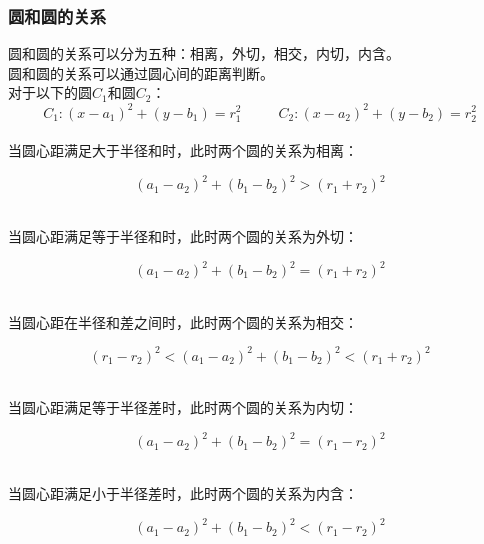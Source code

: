 \documentclass[UTF8]{ctexart}
\begin{document}
\subsubsection{圆和圆的关系}
    \setcounter{equation}{0}
    圆和圆的关系可以分为五种：相离，外切，相交，内切，内含。\\[3mm]
    圆和圆的关系可以通过圆心间的距离判断。\\[5mm]
    对于以下的圆$C_1$和圆$C_2$：
    \begin{equation}
        C_1:(x-a_1)^2+(y-b_1)=r_1^2~~~~~~~~~~~~C_2:(x-a_2)^2+(y-b_2)=r_2^2
    \end{equation}\\
    当圆心距满足大于半径和时，此时两个圆的关系为相离：
    \begin{large}
        \begin{equation*}
            \left(a_1-a_2\right)^2+\left(b_1-b_2\right)^2>(r_1+r_2)^2
        \end{equation*}
    \end{large}\\
    当圆心距满足等于半径和时，此时两个圆的关系为外切：
    \begin{large}
        \begin{equation*}
            \left(a_1-a_2\right)^2+\left(b_1-b_2\right)^2=(r_1+r_2)^2
        \end{equation*}
    \end{large}\\
    当圆心距在半径和差之间时，此时两个圆的关系为相交：
    \begin{large}
        \begin{equation*}
            (r_1-r_2)^2<\left(a_1-a_2\right)^2+\left(b_1-b_2\right)^2<(r_1+r_2)^2
        \end{equation*}
    \end{large}\\
    当圆心距满足等于半径差时，此时两个圆的关系为内切：
    \begin{large}
        \begin{equation*}
            \left(a_1-a_2\right)^2+\left(b_1-b_2\right)^2=(r_1-r_2)^2
        \end{equation*}
    \end{large}\\
    当圆心距满足小于半径差时，此时两个圆的关系为内含：
    \begin{large}
        \begin{equation*}
            \left(a_1-a_2\right)^2+\left(b_1-b_2\right)^2<(r_1-r_2)^2
        \end{equation*}
    \end{large}\\
\end{document}
